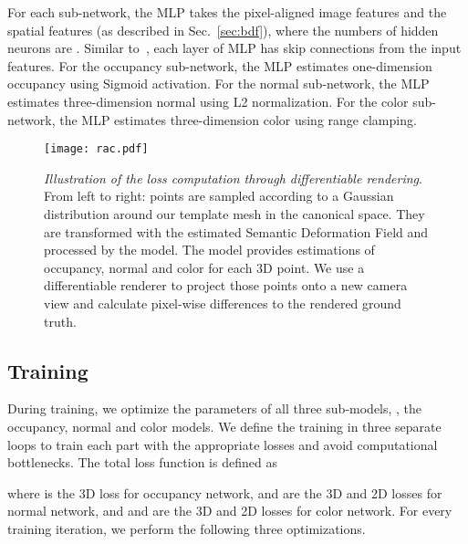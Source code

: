 \documentclass[10pt,twocolumn,letterpaper]{article}
\newcommand{\beforefigcaption}{\vspace{-4mm}}
\newcommand{\afterfigcaption}{\vspace{-4mm}}
\newcommand{\beforesubsection}{\vspace{0mm}}
\newcommand{\aftersubsection}{\vspace{0mm}}
\begin{document}
For each sub-network, the MLP takes the pixel-aligned image features and the spatial features (as described in Sec.~\ref{sec:bdf}), where the numbers of hidden neurons are . Similar to~\cite{PIFuICCV19}, each layer of MLP has skip connections from the input features.
For the occupancy sub-network, the MLP estimates one-dimension occupancy  using Sigmoid activation.
For the normal sub-network, the MLP estimates three-dimension normal  using L2 normalization.
For the color sub-network, the MLP estimates three-dimension color  using range clamping.



\begin{figure*}
\centering
\texttt{[image: rac.pdf]}
\beforefigcaption
\caption{\textit{Illustration of the loss computation through differentiable rendering}. From left to right: points are sampled according to a Gaussian distribution around our template mesh in the canonical space. They are transformed with the estimated Semantic Deformation Field and processed by the model. The model provides estimations of occupancy, normal and color for each 3D point. We use a differentiable renderer to project those points onto a new camera view and calculate pixel-wise differences to the rendered ground truth.}
\afterfigcaption
\label{fig:rac}
\end{figure*}

\beforesubsection
\subsection{Training} \label{sec:learning}
\aftersubsection

During training, we optimize the parameters of all three sub-models, \ie, the occupancy, normal and color models. We define the training in three separate loops to train each part with the appropriate losses and avoid computational bottlenecks. The total loss function is defined as

where  is the 3D loss for occupancy network,  and  are the 3D and 2D losses for normal network, and  and  are the 3D and 2D losses for color network. For every training iteration, we perform the following three optimizations.
\end{document}
